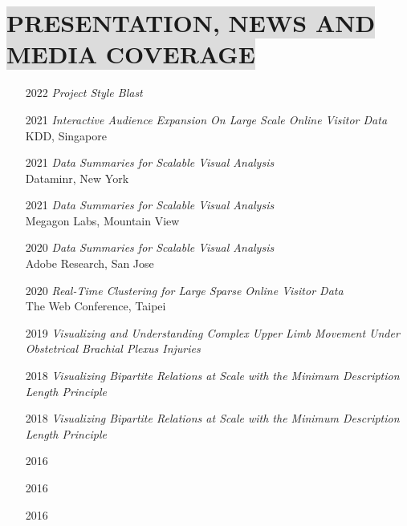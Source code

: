\section*{
    \colorbox{gainsboro}{PRESENTATION, NEWS AND MEDIA COVERAGE}
}
\begin{itemize}[leftmargin=16.5mm,labelsep=9mm,noitemsep]
    \item[2022] \textit{Project Style Blast} \\ 
    \item[2021] \textit{Interactive Audience Expansion On Large Scale Online Visitor Data} \\ KDD, Singapore
    \item[2021] \textit{Data Summaries for Scalable Visual Analysis} \\ Dataminr, New York
    \item[2021] \textit{Data Summaries for Scalable Visual Analysis} \\ Megagon Labs, Mountain View
    \item[2020] \textit{Data Summaries for Scalable Visual Analysis} \\ Adobe Research, San Jose
    \item[2020] \textit{Real-Time Clustering for Large Sparse Online Visitor Data} \\ The Web Conference, Taipei
    \item[2019] \textit{Visualizing and Understanding Complex Upper Limb Movement Under Obstetrical Brachial Plexus Injuries} \\ 
    \item[2018] \textit{Visualizing Bipartite Relations at Scale with the Minimum Description Length Principle} \\ 
    \item[2018] \textit{Visualizing Bipartite Relations at Scale with the Minimum Description Length Principle} \\  
    \item[2016]  
    \item[2016] 
    \item[2016] 
\end{itemize}